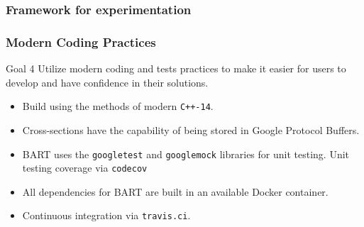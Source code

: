 \documentclass[xcolor=x11names, compress, handout]{beamer}
\begin{document}
\begin{frame}
  \frametitle{Framework for experimentation}
\end{frame}

\begin{frame}
  \frametitle{Modern Coding Practices}
  \begin{block}{Goal 4}
    Utilize modern coding and tests practices to make it
    easier for users to develop and have confidence in their solutions.
  \end{block}
  \begin{itemize}
  \item Build using the methods of modern \texttt{C++-14}.
  \item Cross-sections have the capability of being stored in Google
    Protocol Buffers.
  \item BART uses the \texttt{googletest} and \texttt{googlemock}
    libraries for unit testing. Unit testing coverage via \texttt{codecov}
  \item All dependencies for BART are built in an available Docker
    container.
  \item Continuous integration via \texttt{travis.ci}.
  \end{itemize}  
    
\end{frame}
\end{document}
